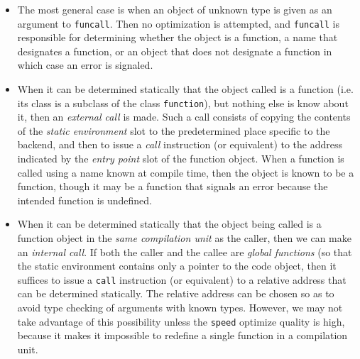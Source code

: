 \begin{itemize}
\item The most general case is when an object of unknown type is given
  as an argument to \texttt{funcall}.  Then no optimization is
  attempted, and \texttt{funcall} is responsible for determining
  whether the object is a function, a name that designates a function,
  or an object that does not designate a function in which case an error is
  signaled.
\item When it can be determined statically that the object called is a
  function (i.e. its class is a subclass of the class
  \texttt{function}), but nothing else is know about it, then an
  \emph{external call} is made.  Such a call consists of copying the
  contents of the \emph{static environment} slot to the predetermined
  place specific to the backend, and then to issue a \emph{call}
  instruction (or equivalent) to the address indicated by the
  \emph{entry point} slot of the function object.  When a function is
  called using a name known at compile time, then the object is known
  to be a function, though it may be a function that signals an error
  because the intended function is undefined.
\item When it can be determined statically that the object being
  called is a function object in the \emph{same compilation unit} as
  the caller, then we can make an \emph{internal call}.  If both the
  caller and the callee are \emph{global functions} (so that the
  static environment contains only a pointer to the code object, then
  it suffices to issue a \texttt{call} instruction (or equivalent) to
  a relative address that can be determined statically. The relative
  address can be chosen so as to avoid type checking of arguments with
  known types.  However, we may not take advantage of this possibility
  unless the \texttt{speed} optimize quality is high, because it makes
  it impossible to redefine a single function in a compilation unit.
\end{itemize}
